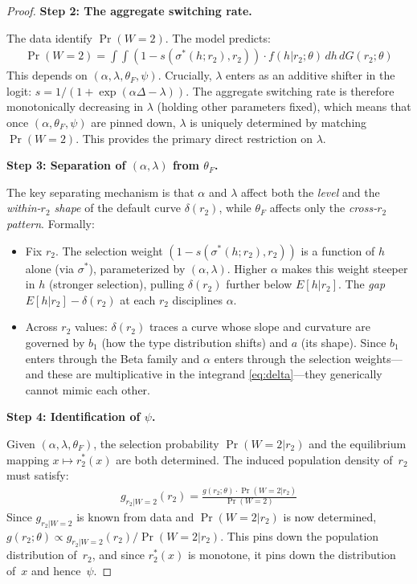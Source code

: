 \documentclass[12pt]{article}
\theoremstyle{plain}
\theoremstyle{plain}
\theoremstyle{definition}  %
\theoremstyle{remark}  %
\begin{document}
\begin{proof}
\medskip\noindent
\textbf{Step 2: The aggregate switching rate.}

The data identify $\Pr(W\!=\!2)$.  The model predicts:
\begin{align}\label{eq:agg_switch}
    \Pr(W\!=\!2) = \int \!\int (1 - s(\sigma^*(h;r_2), r_2)) \cdot f(h|r_2;\theta)\, dh\, dG(r_2;\theta)
\end{align}
This depends on $(\alpha, \lambda, \theta_F, \psi)$.  Crucially, $\lambda$ enters as an additive shifter in the logit: $s = 1/(1+\exp(\alpha\Delta - \lambda))$.  The aggregate switching rate is therefore monotonically decreasing in $\lambda$ (holding other parameters fixed), which means that once $(\alpha, \theta_F, \psi)$ are pinned down, $\lambda$ is uniquely determined by matching $\Pr(W\!=\!2)$.  This provides the primary direct restriction on $\lambda$.

\medskip\noindent
\textbf{Step 3: Separation of $(\alpha, \lambda)$ from $\theta_F$.}

The key separating mechanism is that $\alpha$ and $\lambda$ affect both the \emph{level} and the \emph{within-$r_2$ shape} of the default curve $\delta(r_2)$, while $\theta_F$ affects only the \emph{cross-$r_2$ pattern}.  Formally:
\begin{itemize}
    \item Fix $r_2$.  The selection weight $(1-s(\sigma^*(h;r_2),r_2))$ is a function of $h$ alone (via $\sigma^*$), parameterized by $(\alpha, \lambda)$.  Higher $\alpha$ makes this weight steeper in $h$ (stronger selection), pulling $\delta(r_2)$ further below $E[h|r_2]$.  The \emph{gap} $E[h|r_2] - \delta(r_2)$ at each $r_2$ disciplines $\alpha$.
    \item Across $r_2$ values: $\delta(r_2)$ traces a curve whose slope and curvature are governed by $b_1$ (how the type distribution shifts) and $a$ (its shape).  Since $b_1$ enters through the Beta family and $\alpha$ enters through the selection weights---and these are multiplicative in the integrand \eqref{eq:delta}---they generically cannot mimic each other.
\end{itemize}

\medskip\noindent
\textbf{Step 4: Identification of $\psi$.}

Given $(\alpha, \lambda, \theta_F)$, the selection probability $\Pr(W\!=\!2|r_2)$ and the equilibrium mapping $x \mapsto r_2^*(x)$ are both determined.  The induced population density of~$r_2$ must satisfy:
\begin{align*}
    g_{r_2|W=2}(r_2) = \frac{g(r_2;\theta) \cdot \Pr(W\!=\!2|r_2)}{\Pr(W\!=\!2)}
\end{align*}
Since $g_{r_2|W=2}$ is known from data and $\Pr(W\!=\!2|r_2)$ is now determined, $g(r_2;\theta) \propto g_{r_2|W=2}(r_2) / \Pr(W\!=\!2|r_2)$.  This pins down the population distribution of~$r_2$, and since $r_2^*(x)$ is monotone, it pins down the distribution of~$x$ and hence~$\psi$.


\end{proof}
\end{document}
